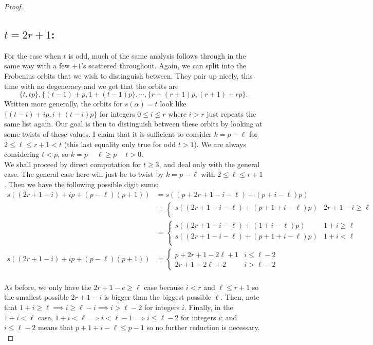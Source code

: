 \begin{proof}
\subsection{$t = 2r+1$:}
For the case when $t$ is odd, much of the same analysis follows through in the same way with a few $+1$'s scattered throughout.
Again, we can split into the Frobenius orbits that we wish to distinguish between. 
They pair up nicely, this time with no degeneracy and we get that the orbits are \[\{t, tp\}, \{(t-1)+p, 1+(t-1)p\}, \cdots, \{r + (r+1) p, (r+1) + r p\}.\] 
Written more generally, the orbits for $s(\alpha) = t$ look like $\{(t-i) + ip, i + (t-i)p\}$ for integers $0 \leq i \leq r $ where $i > r$ just repeats the same list again.
Our goal is then to distinguish between these orbits by looking at some twists of these values.
I claim that it is sufficient to consider $k = p - \ell$ for $2 \leq \ell \leq r + 1 < t$ (this last equality only true for odd $t > 1$).
We are always considering $t < p$, so $k = p - \ell \geq p - t > 0$.
\\

We shall proceed by direct computation for $t \geq 3$, and deal only with the general case.
The general case here will just be to twist by $k = p- \ell$ with $2 \leq \ell \leq r+1$. 
Then we have the following possible digit sums:
\begin{align*}
s((2r+1-i) + ip + (p - \ell)(p+1)) &= s((p + 2r+1 - i - \ell) + (p + i -\ell)p) \\ 
&=\begin{cases}
  s((2r +1- i - \ell) + (p + 1 + i -\ell)p) & 2r+1-i  \geq \ell \\
\end{cases}\\
&=\begin{cases}
  s((2r + 1 - i - \ell) + ( 1 + i -\ell)p) &  1+i \geq \ell \\
  s((2r +1- i - \ell) + (p + 1 + i -\ell)p) & 1 + i < \ell \\
\end{cases} \\
s((2r+1-i)+ip + (p-\ell)(p+1))
&= \begin{cases}
  p+2r+1-2\ell + 1 & i \leq \ell - 2 \\
  2r+1-2\ell + 2 & i > \ell -2
\end{cases}
\end{align*}
\\

As before, we only have the $2r+1-e \geq \ell$ case because $i < r$ and $\ell \leq r+1$ so the smallest possible $2r+1-i$ is bigger than the biggest possible $\ell$.
Then, note that $1 + i \geq \ell \implies i \geq \ell - i \implies i > \ell -2$ for integers $i$.
Finally, in the $1 + i < \ell$ case, $1 + i < \ell \implies i < \ell -1 \implies i \leq \ell -2$ for integers $i$; and $i \leq \ell -2$ means that $p + 1 + i - \ell \leq p-1$ so no further reduction is necessary.
\\



\end{proof}
